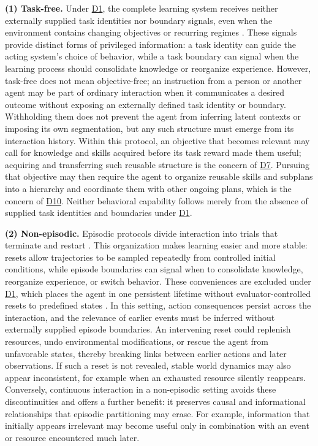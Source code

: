 \documentclass[10pt,journal,compsoc]{IEEEtran}
\DeclareRobustCommand{\Dref}[1]{\hyperref[sec:d#1]{D#1}}
\begin{document}
\noindent\textbf{(1) Task-free.}
Under \Dref{1}, the complete learning system receives neither externally supplied task identities nor boundary signals, even when the environment contains changing objectives or recurring regimes \cite{aljundi2019,caccia2023}.
These signals provide distinct forms of privileged information: a task identity can guide the acting system's choice of behavior, while a task boundary can signal when the learning process should consolidate knowledge or reorganize experience.
However, task-free does not mean objective-free; an instruction from a person or another agent may be part of ordinary interaction when it communicates a desired outcome without exposing an externally defined task identity or boundary.
Withholding them does not prevent the agent from inferring latent contexts or imposing its own segmentation, but any such structure must emerge from its interaction history.
Within this protocol, an objective that becomes relevant may call for knowledge and skills acquired before its task reward made them useful; acquiring and transferring such reusable structure is the concern of \Dref{7}.
Pursuing that objective may then require the agent to organize reusable skills and subplans into a hierarchy and coordinate them with other ongoing plans, which is the concern of \Dref{10}.
Neither behavioral capability follows merely from the absence of supplied task identities and boundaries under \Dref{1}.

\noindent\textbf{(2) Non-episodic.}
Episodic protocols divide interaction into trials that terminate and restart \cite{sutton2018}.
This organization makes learning easier and more stable: resets allow trajectories to be sampled repeatedly from controlled initial conditions, while episode boundaries can signal when to consolidate knowledge, reorganize experience, or switch behavior.
These conveniences are excluded under \Dref{1}, which places the agent in one persistent lifetime without evaluator-controlled resets to predefined states \cite{naik2019,lu2021}.
In this setting, action consequences persist across the interaction, and the relevance of earlier events must be inferred without externally supplied episode boundaries.
An intervening reset could replenish resources, undo environmental modifications, or rescue the agent from unfavorable states, thereby breaking links between earlier actions and later observations.
If such a reset is not revealed, stable world dynamics may also appear inconsistent, for example when an exhausted resource silently reappears.
Conversely, continuous interaction in a non-episodic setting avoids these discontinuities and offers a further benefit: it preserves causal and informational relationships that episodic partitioning may erase.
For example, information that initially appears irrelevant may become useful only in combination with an event or resource encountered much later.
\end{document}
